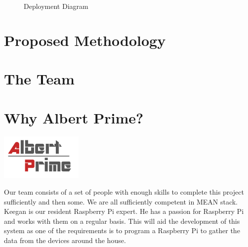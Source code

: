 \documentclass[12pt]{article}
\begin{document}
	\setlength{\fboxsep}{15pt}
	\begin{figure}[htb]
	\caption{Deployment Diagram}
	\end{figure}
	\vfill
	\section{Proposed Methodology}
	
	\newpage
	\section{The Team}
	
	\newpage
	\section{Why Albert Prime?}
	\begin{center}
    	\includegraphics[width=4cm]{../Common/AlbertPrimeLogo.png}
	\end{center}
	Our team consists of a set of people with enough skills to complete this project sufficiently and then some. We are all sufficiently competent in MEAN stack. \\ 
	
	Keegan is our resident Raspberry Pi expert. He has a passion for Raspberry Pi and works with them on a regular basis. This will aid the development of this system as one of the requirements is to program a Raspberry Pi to gather the data from the devices around the house.\\
	
\end{document}
